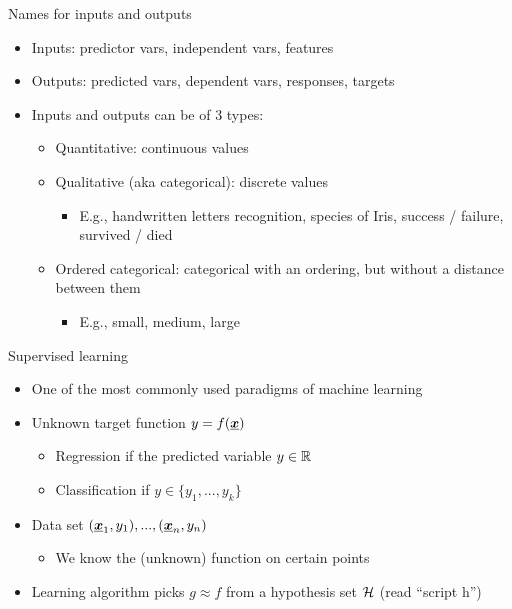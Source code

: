 \documentclass[aspectratio=169, xcolor=dvipsnames]{beamer}
\begin{document}
  \begin{frame}{Names for inputs and outputs}
    \begin{itemize}
      \item Inputs: predictor vars, independent vars, features

      \item Outputs: predicted vars, dependent vars, responses, targets

      \item Inputs and outputs can be of 3 types:
        \begin{itemize}
          \item Quantitative: continuous values

          \item Qualitative (aka categorical): discrete values
            \begin{itemize}
              \item E.g., handwritten letters recognition, species of Iris, success
                / failure, survived / died
            \end{itemize}

          \item Ordered categorical: categorical with an ordering, but without a
            distance between them
            \begin{itemize}
              \item E.g., small, medium, large
            \end{itemize}
        \end{itemize}
    \end{itemize}
  \end{frame}

  \begin{frame}{Supervised learning}
    \begin{itemize}
      \item One of the most commonly used paradigms of machine learning

      \item Unknown target function $y = f(\boldsymbol{\underline{x}})$
        \begin{itemize}
          \item Regression if the predicted variable $y \in \mathbb{R}$

          \item Classification if $y \in \{y_{1}, ..., y_{k}\}$
        \end{itemize}

      \item Data set $(\boldsymbol{\underline{x}}_{1}, y_{1}), ... , (\boldsymbol{\underline{x}}_{n}, y_{n})$
        \begin{itemize}
          \item We know the (unknown) function on certain points
        \end{itemize}

      \item Learning algorithm picks $g \approx f$ from a hypothesis set $\mathcal{H}$
        (read ``script h'')
    \end{itemize}
  \end{frame}
\end{document}
